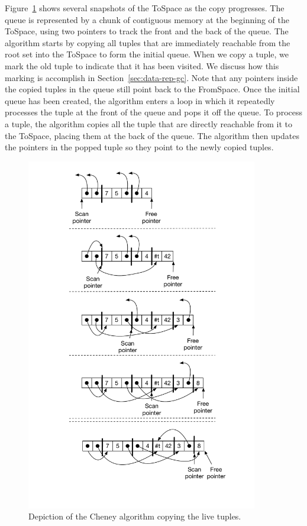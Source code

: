 \documentclass[7x10]{TimesAPriori_MIT}%
\begin{document}
Figure~\ref{fig:cheney} shows several snapshots of the ToSpace as the
copy progresses. The queue is represented by a chunk of contiguous
memory at the beginning of the ToSpace, using two pointers to track
the front and the back of the queue. The algorithm starts by copying
all tuples that are immediately reachable from the root set into the
ToSpace to form the initial queue.  When we copy a tuple, we mark the
old tuple to indicate that it has been visited. We discuss how this
marking is accomplish in Section~\ref{sec:data-rep-gc}. Note that any
pointers inside the copied tuples in the queue still point back to the
FromSpace. Once the initial queue has been created, the algorithm
enters a loop in which it repeatedly processes the tuple at the front
of the queue and pops it off the queue.  To process a tuple, the
algorithm copies all the tuple that are directly reachable from it to
the ToSpace, placing them at the back of the queue. The algorithm then
updates the pointers in the popped tuple so they point to the newly
copied tuples.

\begin{figure}[tbp]
\centering \includegraphics[width=0.9\textwidth]{figs/cheney}
\caption{Depiction of the Cheney algorithm copying the live tuples.}
\label{fig:cheney}
\end{figure}
\end{document}
